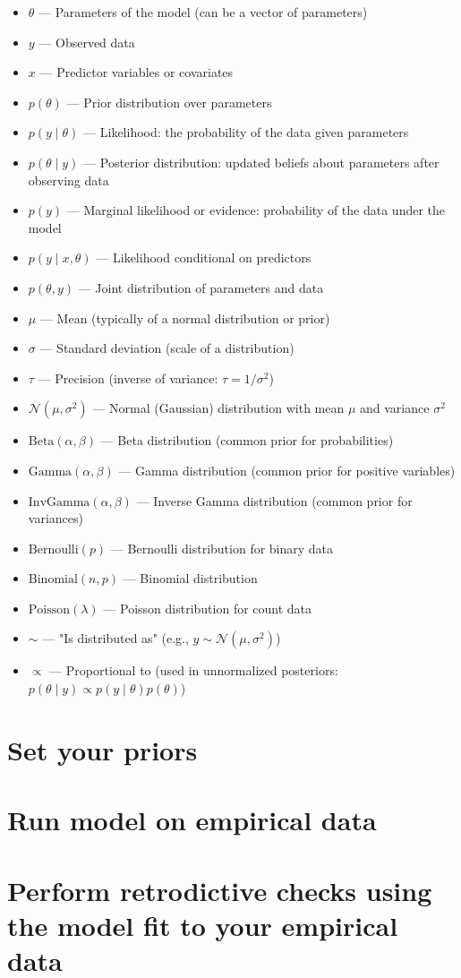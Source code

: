 \documentclass[a4paper,12pt]{article}
\begin{document}
\begin{itemize}
  \item $\theta$ --- Parameters of the model (can be a vector of parameters)
  \item $y$ --- Observed data
  \item $x$ --- Predictor variables or covariates
  \item $p(\theta)$ --- Prior distribution over parameters
  \item $p(y \mid \theta)$ --- Likelihood: the probability of the data given parameters
  \item $p(\theta \mid y)$ --- Posterior distribution: updated beliefs about parameters after observing data
  \item $p(y)$ --- Marginal likelihood or evidence: probability of the data under the model
  \item $p(y \mid x, \theta)$ --- Likelihood conditional on predictors
  \item $p(\theta, y)$ --- Joint distribution of parameters and data
  \item $\mu$ --- Mean (typically of a normal distribution or prior)
  \item $\sigma$ --- Standard deviation (scale of a distribution)
  \item $\tau$ --- Precision (inverse of variance: $\tau = 1/\sigma^2$)
  \item $\mathcal{N}(\mu, \sigma^2)$ --- Normal (Gaussian) distribution with mean $\mu$ and variance $\sigma^2$
  \item $\text{Beta}(\alpha, \beta)$ --- Beta distribution (common prior for probabilities)
  \item $\text{Gamma}(\alpha, \beta)$ --- Gamma distribution (common prior for positive variables)
  \item $\text{InvGamma}(\alpha, \beta)$ --- Inverse Gamma distribution (common prior for variances)
  \item $\text{Bernoulli}(p)$ --- Bernoulli distribution for binary data
  \item $\text{Binomial}(n, p)$ --- Binomial distribution
  \item $\text{Poisson}(\lambda)$ --- Poisson distribution for count data
  \item $\sim$ --- "Is distributed as" (e.g., $y \sim \mathcal{N}(\mu, \sigma^2)$)
  \item $\propto$ --- Proportional to (used in unnormalized posteriors: $p(\theta \mid y) \propto p(y \mid \theta) p(\theta)$)
\end{itemize}





\section{Set your priors}

\section{Run model on empirical data}

\section{Perform retrodictive checks using the model fit to your empirical data}
\end{document}
